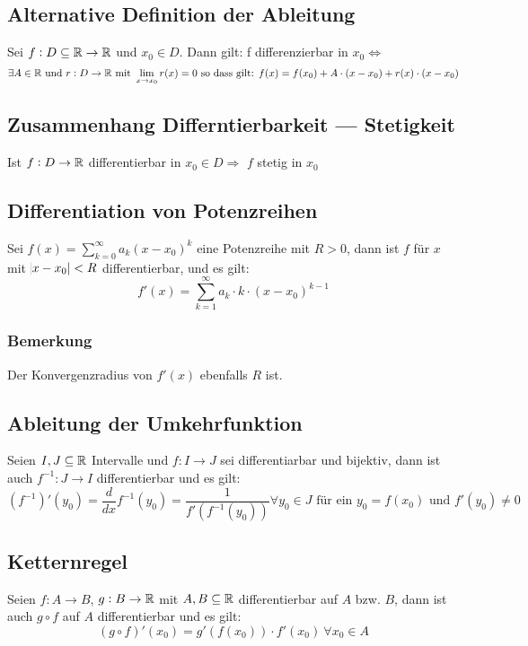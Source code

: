 \subsection{Alternative Definition der Ableitung}
Sei $f: D \subseteq \mathbb{R} \rightarrow \mathbb{R}$ und $x_0 \in D$. Dann gilt:
f differenzierbar in $x_0 \Leftrightarrow$
\begin{equation*}
    \exists A \in \mathbb{R} \text{ und } r: D \rightarrow \mathbb{R} \text{ mit }
    \lim_{x \rightarrow x_0} r(x) = 0 \text{ so dass gilt: }
    f(x) = f(x_0) + A \cdot (x - x_0)  + r(x) \cdot (x-x_0)
\end{equation*}

\subsection{Zusammenhang Differntierbarkeit --- Stetigkeit}
Ist $f: D \rightarrow \mathbb{R}$ differentierbar in $x_0 \in D \Rightarrow$
$f$ stetig in $x_0$

\subsection{Differentiation von Potenzreihen}
Sei $f(x) = \sum_{k=0}^\infty a_k {(x-x_0)}^k$ eine Potenzreihe mit $R>0$, dann
ist $f$ für $x$ mit $\abs{x-x_0}<R$ differentierbar, und es gilt:
\begin{equation*}
    f'(x) = \sum_{k=1}^\infty a_k \cdot k \cdot {(x - x_0)}^{k-1}
\end{equation*}

\subsubsection{Bemerkung}
Der Konvergenzradius von $f'(x)$ ebenfalls $R$ ist.

\subsection{Ableitung der Umkehrfunktion}
Seien $I, J \subseteq \mathbb{R}$ Intervalle und $f: I \rightarrow J$ sei differentiarbar
und bijektiv, dann ist auch $f^{-1}: J \rightarrow I$ differentierbar und es
gilt:
\begin{equation*}
    {(f^{-1})}'(y_0) = \frac{d}{dx} f^{-1}(y_0) =
    \frac{1}{f'(f^{-1}(y_0))} \forall y_0 \in J \text{ für ein } y_0=f(x_0)
    \text{ und } f'(y_0) \neq 0
\end{equation*}

\subsection{Ketternregel}
Seien $f: A \rightarrow B$, $g: B \rightarrow \mathbb{R}$ mit $A,B \subseteq \mathbb{R}$
differentierbar auf $A$ bzw. $B$, dann ist auch $g \circ f$ auf $A$
differentierbar und es gilt:
\begin{equation*}
    (g \circ f)'(x_0) = g'(f(x_0)) \cdot f'(x_0)\ \forall x_0 \in A
\end{equation*}

